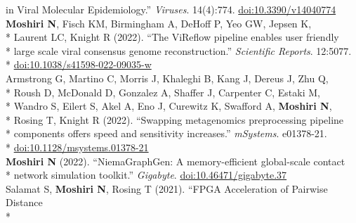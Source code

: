 \documentclass[margin,line]{res}
\begin{document}
\begin{resume}
\hspace*{8mm} in Viral Molecular Epidemiology.'' \textit{Viruses}. 14(4):774. \href{https://doi.org/10.3390/v14040774}{doi:10.3390/v14040774}\\
\hspace*{4mm} \textbf{Moshiri N}, Fisch KM, Birmingham A, DeHoff P, Yeo GW, Jepsen K,\\*
\hspace*{9mm} Laurent LC, Knight R (2022). ``The ViReflow pipeline enables user friendly\\*
\hspace*{9mm} large scale viral consensus genome reconstruction.'' \textit{Scientific Reports}. 12:5077.\\*\vspace{2mm}
\hspace*{8mm} \href{https://doi.org/10.1038/s41598-022-09035-w}{doi:10.1038/s41598-022-09035-w}\\
\hspace*{4mm} Armstrong G, Martino C, Morris J, Khaleghi B, Kang J, Dereus J, Zhu Q,\\*
\hspace*{9mm} Roush D, McDonald D, Gonzalez A, Shaffer J, Carpenter C, Estaki M,\\*
\hspace*{9mm} Wandro S, Eilert S, Akel A, Eno J, Curewitz K, Swafford A, \textbf{Moshiri N},\\*
\hspace*{9mm} Rosing T, Knight R (2022). ``Swapping metagenomics preprocessing pipeline\\*
\hspace*{9mm} components offers speed and sensitivity increases.'' \textit{mSystems}. e01378-21.\\*\vspace{2mm}
\hspace*{8mm} \href{https://doi.org/10.1128/msystems.01378-21}{doi:10.1128/msystems.01378-21}\\
\hspace*{4mm} \textbf{Moshiri N} (2022). ``NiemaGraphGen: A memory-efficient global-scale contact\\*\vspace{2mm}
\hspace*{8mm} network simulation toolkit.'' \textit{Gigabyte}. \href{https://doi.org/10.46471/gigabyte.37}{doi:10.46471/gigabyte.37}\\
\hspace*{4mm} Salamat S, \textbf{Moshiri N}, Rosing T (2021). ``FPGA Acceleration of Pairwise Distance\\*

\end{resume}
\end{document}
